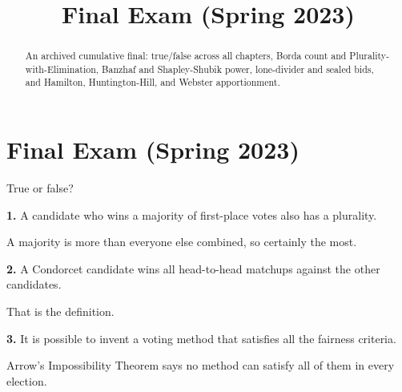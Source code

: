 \documentclass[12pt]{ximera}
\title{Final Exam (Spring 2023)}
\begin{document}
\begin{abstract}
An archived cumulative final: true/false across all chapters, Borda count and Plurality-with-Elimination, Banzhaf and Shapley-Shubik power, lone-divider and sealed bids, and Hamilton, Huntington-Hill, and Webster apportionment.
\end{abstract}
\maketitle

\section*{Final Exam (Spring 2023)}

\begin{problem}
True or false?

\begin{prompt}
\textbf{1.} A candidate who wins a majority of first-place votes also has a plurality.
\begin{multipleChoice}
\end{multipleChoice}
\begin{feedback}
A majority is more than everyone else combined, so certainly the most.
\end{feedback}
\end{prompt}

\begin{prompt}
\textbf{2.} A Condorcet candidate wins all head-to-head matchups against the other candidates.
\begin{multipleChoice}
\end{multipleChoice}
\begin{feedback}
That is the definition.
\end{feedback}
\end{prompt}

\begin{prompt}
\textbf{3.} It is possible to invent a voting method that satisfies all the fairness criteria.
\begin{multipleChoice}
\end{multipleChoice}
\begin{feedback}
Arrow's Impossibility Theorem says no method can satisfy all of them in every election.
\end{feedback}
\end{prompt}


\end{problem}
\end{document}

